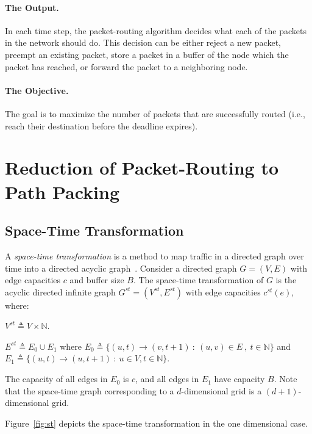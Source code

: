 \documentclass[11pt]{article}
\newenvironment{proof sketch}[1]{\noindent {\emph{Proof sketch of #1:}}}{\hfill \qed}
\begin{document}
\paragraph{The Output.}
In each time step, the packet-routing algorithm decides what each of the packets in
the network should do. This decision can be either reject a new packet,
preempt an existing packet, store a packet in a buffer of the node which the
packet has reached, or forward the packet to a neighboring node.

\paragraph{The Objective.}
The goal is to maximize the number of packets that are
successfully routed (i.e., reach their destination before
the deadline expires).

\section{Reduction of Packet-Routing to Path Packing}
\label{sec:prelim}

\subsection{Space-Time Transformation}
\label{sec:spacetime}

A\emph{ space-time transformation} is a method to map traffic in a directed graph over time into a directed acyclic graph~\cite{AAF,ARSU,AZ,RR}. Consider a directed graph $G=(V,E)$ with edge capacities $c$ and buffer size $B$.
The space-time transformation of $G$ is the acyclic directed infinite graph $G^{st}=(V^{st},E^{st})$ with edge capacities $c^{st}(e)$, where:
\begin{inparaenum}[(i)]
\item $V^{st} \triangleq V\times \mathbb{N}$.
\item $E^{st}\triangleq E_0\cup E_1$ where $E_0\triangleq \{
  (u,t)\rightarrow(v,t+1)\::\: (u,v)\in E~,~t\in\mathbb{N}\}$ and $E_1
  \triangleq \{ (u,t)\rightarrow (u,t+1) \::\: u\in V, t\in
  \mathbb{N}\}$.
\item The capacity of all edges in $E_0$ is $c$, and all edges in $E_1$ have capacity $B$. Note that the space-time graph corresponding to a $d$-dimensional grid is a $(d+1)$-dimensional grid.
\end{inparaenum}
Figure~\ref{fig:st} depicts the space-time transformation in the one dimensional case.
\end{document}
